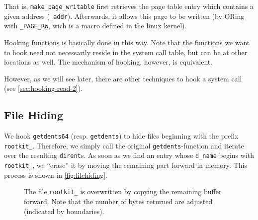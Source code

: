 \documentclass[10pt, letterpaper]{scrartcl}
\newcommand{\todo}[1]{\textcolor{red}{TODO: #1}}
\begin{document}
That is, \texttt{make\_page\_writable} first retrieves the page table entry which contains a given address (\texttt{\_addr}). Afterwards, it allows this page to be written (by ORing with \texttt{\_PAGE\_RW}, wich is a macro defined in the linux kernel). %

Hooking functions is basically done in this way. Note that the functions we want to hook need not necessarily reside in the system call table, but can be at other locations as well. The mechanism of hooking, however, is equivalent.

However, as we will see later, there are other techniques to hook a system call (see \autoref{sec:hooking-read-2}).

\subsection{File Hiding}
\label{filehiding}

We hook \texttt{getdents64} (resp. \texttt{getdents}) to hide files beginning with the prefix \texttt{rootkit\_}. 
Therefore, we simply call the original \texttt{getdents}-function and iterate over the resulting
\texttt{dirent}s. As soon as we find an entry whose \texttt{d\_name} begins with \texttt{rootkit\_},
we ``erase'' it by moving the remaining part forward in memory. This process is shown in \autoref{fig:filehiding}.


\begin{figure}[ht]
\centering
{}
\caption{The file \texttt{rootkit\_} is overwritten by copying the remaining buffer forward. Note that the number of bytes returned are adjusted (indicated by boundaries).}
\label{fig:filehiding}
\end{figure}
\end{document}
